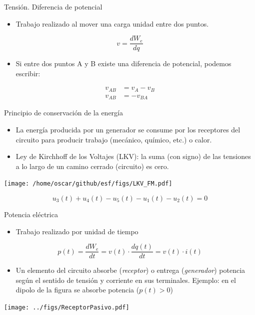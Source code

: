 \documentclass[xcolor={usenames,svgnames,dvipsnames}]{beamer}
\begin{document}
\begin{frame}[label={sec:org3fe045f}]{Tensión. Diferencia de potencial}
\begin{itemize}
\item \alert{Trabajo realizado al mover una carga unidad entre dos puntos}.
\end{itemize}

\[
v=\frac{dW_{e}}{dq}
\]

\begin{itemize}
\item Si entre dos puntos A y B existe una diferencia de potencial, podemos
escribir:
\end{itemize}
\begin{align*}
         v_{AB} &=  v_{A}-v_{B}\\
         v_{AB} &=  -v_{BA}
\end{align*}
\end{frame}

\begin{frame}[label={sec:org0e0389f}]{Principio de conservación de la energía}
\begin{itemize}
\item La energía producida por un generador se consume por los receptores
del circuito para producir trabajo (mecánico, químico, etc.) o
calor.

\item \alert{Ley de Kirchhoff de los Voltajes (LKV)}: la suma (con signo) de las
tensiones a lo largo de un camino cerrado (circuito) es cero.
\end{itemize}

\begin{center}
\texttt{[image: /home/oscar/github/esf/figs/LKV\_FM.pdf]}
\end{center}

\[
u_3(t) + u_4 (t) - u_5 (t) - u_1 (t) - u_2 (t)  = 0
\]
\end{frame}

\begin{frame}[label={sec:orgf0ddb42}]{Potencia eléctrica}
\begin{itemize}
\item Trabajo realizado por unidad de tiempo
\end{itemize}
\[
p(t)=\frac{dW_{e}}{dt}=v(t)\cdot\frac{dq(t)}{dt}=v(t)\cdot i(t)
\]

\begin{itemize}
\item Un elemento del circuito absorbe (\emph{receptor}) o entrega
(\emph{generador}) potencia según el sentido de tensión y corriente en
sus terminales. Ejemplo: en el dipolo de la figura se absorbe
potencia (\(p(t)>0\))
\end{itemize}
\begin{center}
\texttt{[image: ../figs/ReceptorPasivo.pdf]}
\end{center}
\end{frame}
\end{document}
